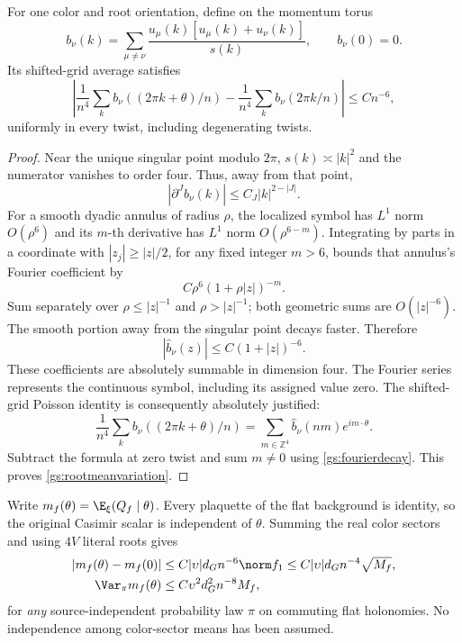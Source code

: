 \begin{lemma}
\label{gs:holonomymean}
For one color and root orientation, define on the momentum torus
\[
 b_\nu(k)=\sum_{\mu\ne\nu}
       \frac{u_\mu(k)[u_\mu(k)+u_\nu(k)]}{s(k)},\qquad b_\nu(0)=0.
\]
Its shifted-grid average satisfies
\begin{equation}
 \left|\frac1{n^4}\sum_kb_\nu((2\pi k+\theta)/n)
       -\frac1{n^4}\sum_kb_\nu(2\pi k/n)\right|
 \le Cn^{-6},
 \label{gs:rootmeanvariation}
\end{equation}
uniformly in every twist, including degenerating twists.
\end{lemma}
\begin{proof}
Near the unique singular point modulo \(2\pi\), \(s(k)\asymp|k|^2\) and the
numerator vanishes to order four. Thus, away from that point,
\[
 |\partial^J b_\nu(k)|\le C_J|k|^{2-|J|}.
\]
For a smooth dyadic annulus of radius \(\rho\), the localized symbol has
\(L^1\) norm \(O(\rho^6)\) and its \(m\)-th derivative has \(L^1\) norm
\(O(\rho^{6-m})\). Integrating by parts in a coordinate with
\(|z_j|\ge|z|/2\), for any fixed integer \(m>6\), bounds that annulus's
Fourier coefficient by
\[
 C\rho^6(1+\rho|z|)^{-m}.
\]
Sum separately over \(\rho\le|z|^{-1}\) and \(\rho>|z|^{-1}\); both
geometric sums are \(O(|z|^{-6})\). The smooth portion away from the singular
point decays faster. Therefore
\begin{equation}
 |\widehat b_\nu(z)|\le C(1+|z|)^{-6}.
 \label{gs:fourierdecay}
\end{equation}
These coefficients are absolutely summable in dimension four. The Fourier
series represents the continuous symbol, including its assigned value zero.
The shifted-grid Poisson identity is consequently absolutely justified:
\[
 \frac1{n^4}\sum_kb_\nu((2\pi k+\theta)/n)
 =\sum_{m\in\mathbb Z^4}\widehat b_\nu(nm)e^{im\cdot\theta}.
\]
Subtract the formula at zero twist and sum \(m\ne0\) using
\eqref{gs:fourierdecay}. This proves \eqref{gs:rootmeanvariation}.
\end{proof}

Write \(m_f(\theta)=\E_\xi(Q_f\mid\theta)\). Every plaquette of the flat
background is identity, so the original Casimir scalar is independent of
\(\theta\). Summing the real color sectors and using \(4V\) literal roots gives
\begin{align}
 |m_f(\theta)-m_f(0)|
 &\le C|\upsilon|d_Gn^{-6}\norm f_1
 \le C|\upsilon|d_Gn^{-4}\sqrt{M_f},\label{gs:meancomparison}\\
 \Var_\pi m_f(\theta)&\le C\upsilon^2d_G^2n^{-8}M_f,
 \label{gs:betweenholonomy}
\end{align}
for \emph{any} source-independent probability law \(\pi\) on commuting flat
holonomies. No independence among color-sector means has been assumed.

